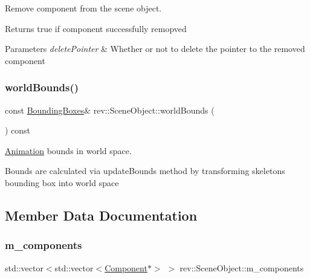 Remove component from the scene object. 

Returns true if component successfully remopved 
\begin{DoxyParams}{Parameters}
{\em delete\+Pointer} & Whether or not to delete the pointer to the removed component \\
\hline
\end{DoxyParams}
\mbox{\label{classrev_1_1_scene_object_a21b3f3119f7228a78bfe077c6e57a0b8}} 
\subsubsection{\texorpdfstring{worldBounds()}{worldBounds()}}
{\footnotesize\ttfamily const \mbox{\hyperlink{classrev_1_1_bounding_geometry}{Bounding\+Boxes}}\& rev\+::\+Scene\+Object\+::world\+Bounds (\begin{DoxyParamCaption}{ }\end{DoxyParamCaption}) const\hspace{0.3cm}{\ttfamily [inline]}}



\mbox{\hyperlink{classrev_1_1_animation}{Animation}} bounds in world space. 

Bounds are calculated via update\+Bounds method by transforming skeleton\textquotesingle{}s bounding box into world space 

\subsection{Member Data Documentation}
\mbox{\label{classrev_1_1_scene_object_aab3dd77506ac3ec6adcae61cbad58395}} 
\subsubsection{\texorpdfstring{m\_components}{m\_components}}
{\footnotesize\ttfamily std\+::vector$<$std\+::vector$<$\mbox{\hyperlink{classrev_1_1_component}{Component}}$\ast$$>$ $>$ rev\+::\+Scene\+Object\+::m\+\_\+components\hspace{0.3cm}{\ttfamily [protected]}}



